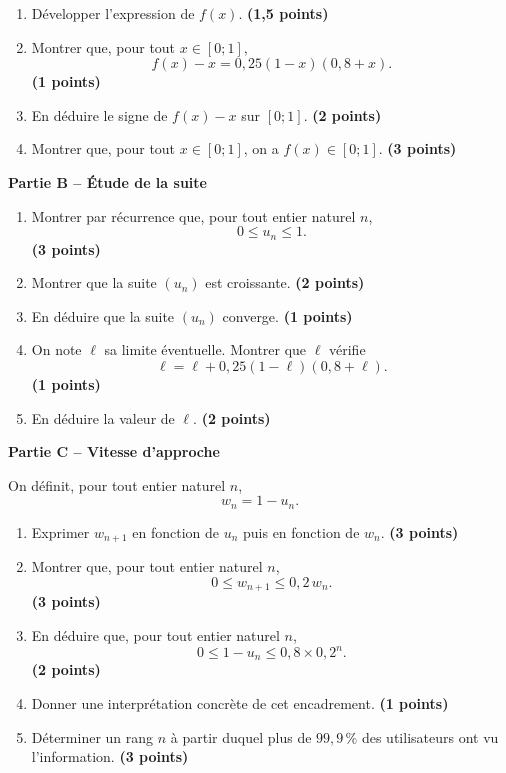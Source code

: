 \documentclass[11pt,a4paper]{article}
\newcommand{\bareme}[1]{\hfill{\color{blue!70!black}\textbf{(#1 points)}}}
\begin{document}
\begin{enumerate}[label=\textbf{A.\arabic*.}, leftmargin=0.9cm]
    \item Développer l’expression de $f(x)$. \bareme{1,5}
    \item Montrer que, pour tout $x\in[0;1]$,
    \[
    f(x)-x=0{,}25(1-x)(0{,}8+x).
    \]
    \bareme{1}
    \item En déduire le signe de $f(x)-x$ sur $[0;1]$. \bareme{2}
    \item Montrer que, pour tout $x\in[0;1]$, on a $f(x)\in[0;1]$. \bareme{3}
\end{enumerate}

\medskip

\textbf{Partie B -- Étude de la suite}

\begin{enumerate}[label=\textbf{B.\arabic*.}, leftmargin=0.9cm]
    \item Montrer par récurrence que, pour tout entier naturel $n$,
    \[
    0\leq u_n\leq 1.
    \]
    \bareme{3}
    \item Montrer que la suite $(u_n)$ est croissante. \bareme{2}
    \item En déduire que la suite $(u_n)$ converge. \bareme{1}
    \item On note $\ell$ sa limite éventuelle. Montrer que $\ell$ vérifie
    \[
    \ell=\ell+0{,}25(1-\ell)(0{,}8+\ell).
    \]
    \bareme{1}
    \item En déduire la valeur de $\ell$. \bareme{2}
\end{enumerate}

\medskip

\textbf{Partie C -- Vitesse d’approche}

On définit, pour tout entier naturel $n$,
\[
w_n=1-u_n.
\]

\begin{enumerate}[label=\textbf{C.\arabic*.}, leftmargin=0.9cm]
    \item Exprimer $w_{n+1}$ en fonction de $u_n$ puis en fonction de $w_n$. \bareme{3}
    \item Montrer que, pour tout entier naturel $n$,
    \[
    0\leq w_{n+1}\leq 0{,}2\,w_n.
    \]
    \bareme{3}
    \item En déduire que, pour tout entier naturel $n$,
    \[
    0\leq 1-u_n\leq 0{,}8\times 0{,}2^n.
    \]
    \bareme{2}
    \item Donner une interprétation concrète de cet encadrement. \bareme{1}
    \item Déterminer un rang $n$ à partir duquel plus de $99{,}9\,\%$ des utilisateurs ont vu l’information. \bareme{3}
\end{enumerate}
\end{document}
